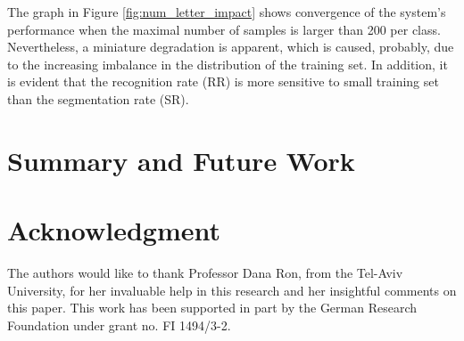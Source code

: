 \documentclass[10pt, conference, compsocconf]{IEEEtran}
\begin{document}
The graph in Figure \ref{fig:num_letter_impact} shows convergence of the system's performance when the maximal number of samples is larger than 200 per class. 
Nevertheless, a miniature degradation is apparent, which is caused, probably, due to the increasing imbalance in the distribution of the training set.
In addition, it is evident that the recognition rate (RR) is more sensitive to small training set than the segmentation rate (SR).

\section{Summary and Future Work}

\section*{Acknowledgment}
The authors would like to thank Professor Dana Ron, from the Tel-Aviv University, for her invaluable help in this research and her insightful comments on this paper. This work has been supported in part by the German Research Foundation under grant no. FI 1494/3-2.



\end{document}
